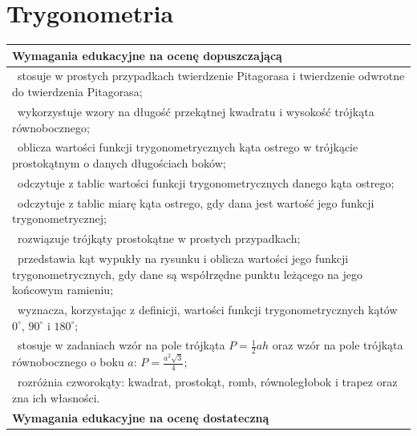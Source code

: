 \documentclass[12pt,a4paper]{article}
\begin{document}
	\section{Trygonometria}
	
	\begin{longtable}{|p{16cm}|}
		\hline
		
		\textbf{Wymagania edukacyjne na ocenę dopuszczającą} \\ \hline
		
		\textbullet\ stosuje w prostych przypadkach twierdzenie Pitagorasa i twierdzenie odwrotne do twierdzenia Pitagorasa; \\
		
		\textbullet\ wykorzystuje wzory na długość przekątnej kwadratu i wysokość trójkąta równobocznego; \\
		
		\textbullet\ oblicza wartości funkcji trygonometrycznych kąta ostrego w trójkącie prostokątnym o danych długościach boków; \\
		
		\textbullet\ odczytuje z tablic wartości funkcji trygonometrycznych danego kąta ostrego; \\
		
		\textbullet\ odczytuje z tablic miarę kąta ostrego, gdy dana jest wartość jego funkcji trygonometrycznej; \\
		
		\textbullet\ rozwiązuje trójkąty prostokątne w prostych przypadkach; \\
		
		\textbullet\ przedstawia kąt wypukły na rysunku i oblicza wartości jego funkcji trygonometrycznych, gdy dane są współrzędne punktu leżącego na jego końcowym ramieniu; \\
		
		\textbullet\ wyznacza, korzystając z definicji, wartości funkcji trygonometrycznych kątów $0^\circ$, $90^\circ$ i $180^\circ$; \\
		
		\textbullet\ stosuje w zadaniach wzór na pole trójkąta $P=\frac{1}{2}ah$ oraz wzór na pole trójkąta równobocznego o boku $a$: $P=\frac{a^2\sqrt{3}}{4}$; \\
		
		\textbullet\ rozróżnia czworokąty: kwadrat, prostokąt, romb, równoległobok i trapez oraz zna ich własności. \\ \hline
		
		\textbf{Wymagania edukacyjne na ocenę dostateczną} \\ \hline
		

\end{longtable}
\end{document}
